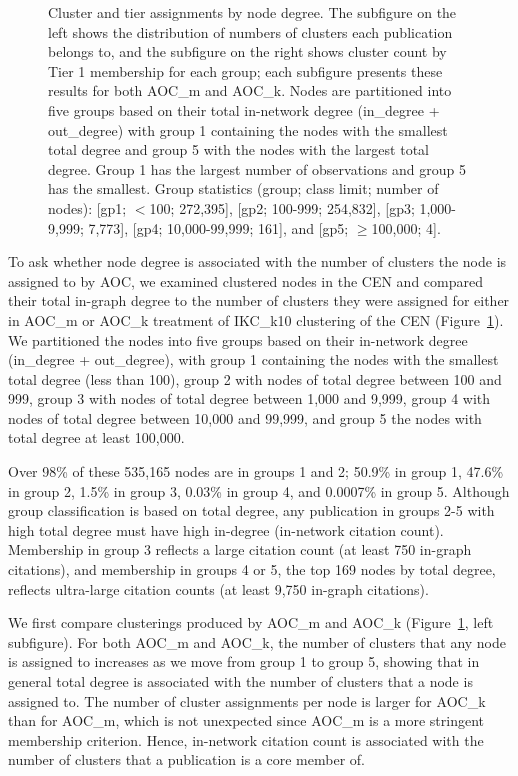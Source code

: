 \documentclass[12pt, oneside]{article}   	%
\begin{document}
\begin{figure}
\begin{subfigure}[t]{0.48\textwidth}
\end{subfigure}
\captionsetup{width=0.9\textwidth}	
\caption{Cluster and tier assignments by node degree. The subfigure on the left shows the distribution of numbers of clusters each publication belongs to, and the subfigure on the right shows cluster count by Tier 1 membership for each group; each subfigure presents these results for both AOC\_m and AOC\_k. Nodes are partitioned into five groups based on their total in-network degree (in\_degree + out\_degree) with group 1 containing the nodes with the smallest total degree and group 5 with the nodes with the largest total degree. Group 1 has the largest number of observations and group 5 has the smallest. Group statistics (group; class limit; number of nodes): [gp1; $<$100;  272,395], [gp2; 100-999; 254,832], [gp3; 1,000-9,999; 7,773], [gp4; 10,000-99,999; 161], and [gp5; $\geq$100,000; 4]. }
\label{fig:fig3}
\end{figure}
	
To ask whether node degree is associated with the number of clusters the node is assigned to by AOC, we examined clustered nodes in the CEN and compared their total in-graph degree to the number of clusters they were assigned for either in AOC\_m or AOC\_k treatment of IKC\_k10 clustering of the CEN (Figure~\ref{fig:fig3}). We partitioned the nodes into five groups based on their in-network degree (in\_degree + out\_degree),  with group 1 containing the nodes with the smallest total degree (less than 100), group 2 with nodes of total degree between 100 and 999, group 3 with nodes of total degree between 1,000 and 9,999, group 4 with nodes of total degree between 10,000 and 99,999, and group 5 the nodes with total degree at least 100,000.

Over 98\% of these 535,165 nodes are in groups 1 and 2; 50.9\% in group 1, 47.6\% in group  2, 1.5\% in group 3,  0.03\% in group 4, and 0.0007\% in group 5. 
Although group classification is based on total degree,  any publication in groups 2-5 with high total degree must have high in-degree (in-network citation count). Membership in group 3  reflects a large citation count (at least 750 in-graph citations), and membership in groups 4 or 5, the top 169 nodes by total degree, reflects ultra-large citation counts (at least 9,750 in-graph citations).    
	
We first compare clusterings produced by AOC\_m and AOC\_k (Figure~\ref{fig:fig3}, left subfigure). For both AOC\_m and AOC\_k, the number of clusters that any node is assigned to increases as we move from group 1 to group 5, showing that in general total degree is associated with the number of clusters that a node is assigned to. The number of cluster assignments per node is larger for AOC\_k than for AOC\_m, which is not unexpected since AOC\_m is a more stringent membership criterion. Hence, in-network citation count is associated with the number of clusters that a publication is a core member of.
	
\end{document}
